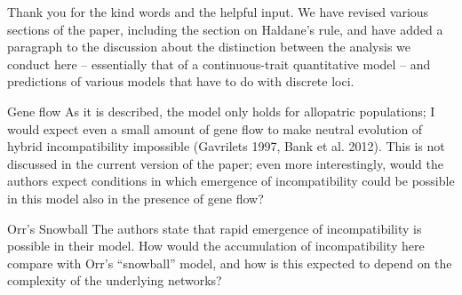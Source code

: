 Thank you for the kind words and the helpful input.
We have revised various sections of the paper,
including the section on Haldane's rule,
and have added a paragraph to the discussion about the distinction between
the analysis we conduct here -- essentially that of a continuous-trait quantitative model --
and predictions of various models that have to do with discrete loci.

\begin{point}{Gene flow}
As it is described, the model only holds for allopatric populations; I would expect even a small amount of gene flow to make neutral evolution of hybrid incompatibility impossible (Gavrilets 1997, Bank et al. 2012). This is not discussed in the current version of the paper; even more interestingly, would the authors expect conditions in which emergence of incompatibility could be possible in this model also in the presence of gene flow?
\end{point}


\begin{point}{Orr's Snowball}
The authors state that rapid emergence of incompatibility is possible in their model. How would the accumulation of incompatibility here compare with Orr’s ``snowball'' model, and how is this expected to depend on the complexity of the underlying networks?
\end{point}

